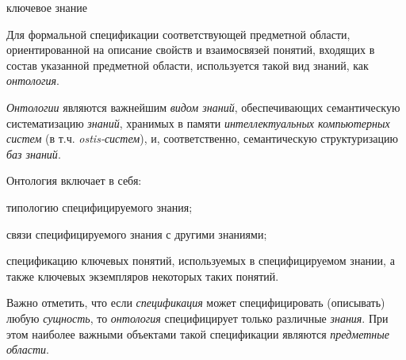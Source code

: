 \begin{SCn}
	\begin{scnrelfromlist}{ключевое знание}
	\end{scnrelfromlist}
\end{SCn}

Для формальной спецификации соответствующей предметной области, ориентированной на описание свойств и взаимосвязей понятий, входящих в состав указанной предметной области, используется такой вид знаний, как \textit{онтология}.

\textit{Онтологии} являются важнейшим \textit{видом знаний}, обеспечивающих семантическую систематизацию \textit{знаний}, хранимых в памяти\textit{ интеллектуальных компьютерных систем} (в т.ч. \textit{ostis-систем}), и, соответственно, семантическую структуризацию \textit{баз знаний}.

\begin{SCn}
\end{SCn}

Онтология включает в себя:
\begin{textitemize}
	\item {типологию специфицируемого знания};
	\item{связи специфицируемого знания с другими знаниями};
	\item{спецификацию ключевых понятий, используемых в специфицируемом знании, а также ключевых экземпляров некоторых таких понятий}.
\end{textitemize}

Важно отметить, что если \textit{спецификация} может специфицировать (описывать) любую \textit{сущность}, то \textit{онтология} специфицирует только различные \textit{знания}. При этом наиболее важными объектами такой спецификации являются \textit{предметные области}.

